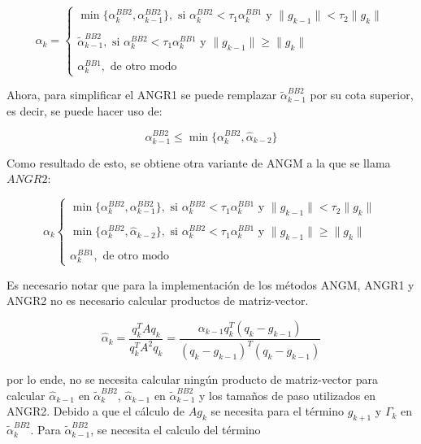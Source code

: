 \begin{equation}
    \alpha_k =\begin{cases} \min\{\alpha_k^{BB2}, \alpha_{k-1}^{BB2}\}, \text{ \ si \ } \alpha_k^{BB2}<\tau_1\alpha_k^{BB1}\text{ \ y \ } \|g_{k-1}\|<\tau_2\|g_k\| \\\\
        \tilde{\alpha}_{k-1}^{BB2}, \text{ \ si \ } \alpha_k^{BB2} < \tau_1\alpha_k^{BB1} \text{ \ y \ } \|g_{k-1}\|\geq \|g_k\|                \\\\
        \alpha_k^{BB1}, \text{ \ de otro modo \ }
    \end{cases}
    \label{eq:ANGR1}
\end{equation}

Ahora, para simplificar el ANGR1 se puede remplazar $\tilde{\alpha}_{k-1}^{BB2}$ por su cota superior, es decir, se puede hacer uso de:

\begin{equation*}
    \alpha_{k-1}^{BB2}\leq \min{\{\alpha_k^{BB2}, \hat{\alpha}_{k-2}\}}
\end{equation*}

Como resultado de esto, se obtiene otra variante de ANGM a la que se llama $ANGR2$:

\begin{equation}
    \alpha_k \begin{cases} \min\{\alpha_k^{BB2}, \alpha_{k-1}^{BB2}\}, \text{ \ si \ } \alpha_k^{BB2}<\tau_1\alpha_k^{BB1}\text{ \ y \ } \|g_{k-1}\|<\tau_2\|g_k\|    \\\\
        \min{\{\alpha_k^{BB2}, \hat{\alpha}_{k-2}\}}, \text{ \ si \ } \alpha_k^{BB2} < \tau_1\alpha_k^{BB1} \text{ \ y \ } \|g_{k-1}\|\geq \|g_k\| \\\\
        \alpha_k^{BB1}, \text{ \ de otro modo \ }
    \end{cases}
    \label{eq:ANGR2}
\end{equation}

Es necesario notar que para la implementación de los métodos ANGM, ANGR1 y ANGR2 no es necesario calcular productos de matriz-vector.

\begin{equation*}
    \hat{\alpha}_k= \frac{q_k^T A q_k}{q_k^T A^2 q_k} = \frac{\alpha_{k-1}q_k^T(q_k-g_{k-1})}{(q_k - g_{k-1})^T(q_k-g_{k-1})}
\end{equation*}

por lo ende, no se necesita calcular ningún producto de matriz-vector para calcular $\hat{\alpha}_{k-1}$ en $\tilde{\alpha}_k^{BB2}$, $\hat{\alpha}_{k-1}$ en $\tilde{\alpha}_{k-1}^{BB2}$ y los tamaños de paso utilizados en ANGR2. Debido a que el cálculo de $Ag_k$ se necesita para el término $g_{k+1}$ y $\Gamma_k$ en $\tilde{\alpha}_k^{BB2}$. Para $\tilde{\alpha}_{k-1}^{BB2}$, se necesita el calculo del término

